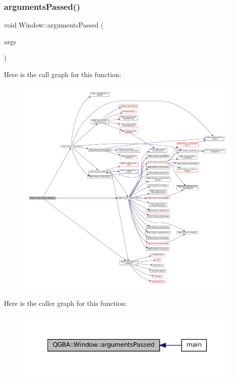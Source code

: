 \subsubsection{\texorpdfstring{arguments\+Passed()}{argumentsPassed()}}
{\footnotesize\ttfamily void Window\+::arguments\+Passed (\begin{DoxyParamCaption}\item[{m\+Arguments $\ast$}]{args }\end{DoxyParamCaption})}

Here is the call graph for this function\+:
\nopagebreak
\begin{figure}[H]
\begin{center}
\leavevmode
\includegraphics[width=350pt]{class_q_g_b_a_1_1_window_a5015ae1d839b7d793a547c292df687b3_cgraph}
\end{center}
\end{figure}
Here is the caller graph for this function\+:
\nopagebreak
\begin{figure}[H]
\begin{center}
\leavevmode
\includegraphics[width=340pt]{class_q_g_b_a_1_1_window_a5015ae1d839b7d793a547c292df687b3_icgraph}
\end{center}
\end{figure}
\mbox{\label{class_q_g_b_a_1_1_window_ab2307df8cc2d23a22d78d2e3fbc71fde}} 
